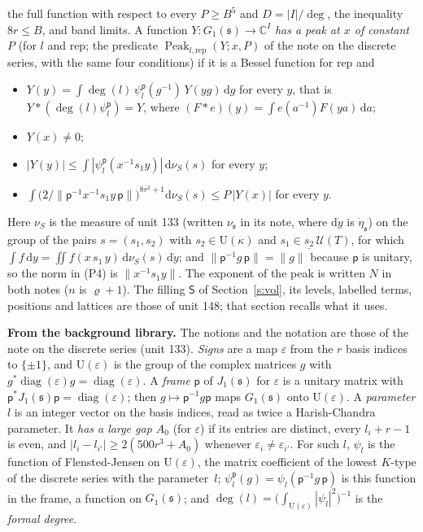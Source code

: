 \documentclass[11pt,a4paper]{article}
\newcommand{\subhead}[1]{\par\addvspace{9pt plus 2pt}\Needspace{4\baselineskip}\noindent\textbf{#1}\enspace\ignorespaces}
\theoremstyle{plainx}
\theoremstyle{uprightx}
\newcommand{\CC}{\mathbb{C}}
\newcommand{\dd}{\mathrm{d}}
\newcommand{\UT}[1]{\mathcal{U}(#1)}
\newcommand{\Gone}[1]{G_1(#1)}
\newcommand{\Jone}[1]{J_1(#1)}
\newcommand{\emb}[1]{\underline{#1}}
\begin{document}
the full function with respect to every $P\ge B^{5}$ and $D=|I|/\deg$, the inequality $8r\le B$, and band limits.
A function $Y\colon\Gone{\mathfrak{s}}\to\CC^I$ \emph{has a peak at $x$ of constant $P$} (for $l$ and
$\mathrm{rep}$; the predicate $\operatorname{Peak}_{l,\mathrm{rep}}(Y;x,P)$ of the note on the discrete series, with
the same four conditions) if it is a Bessel function for $\mathrm{rep}$ and
\begin{itemize}
\item[(P1)] $Y(y)=\int\deg(l)\,\psi^{\mathsf{p}}_l(g^{-1})\,Y(yg)\,\dd g$ for every $y$, that is
  $Y*(\deg(l)\psi^{\mathsf{p}}_l)=Y$, where $(F*e)(y)=\int e(a^{-1})F(ya)\,\dd a$;
\item[(P2)] $Y(x)\ne0$;
\item[(P3)] $|Y(y)|\le\int|\psi^{\mathsf{p}}_l(x^{-1}s_1y)|\,\dd\nu_S(s)$ for every $y$;
\item[(P4)] $\int\bigl(2/\|\mathsf{p}^{-1}x^{-1}s_1y\,\mathsf{p}\|\bigr)^{8r^{2}+1}\dd\nu_S(s)\le P\,|Y(x)|$ for every $y$.
\end{itemize}
Here $\nu_S$ is the measure of unit 133 (written $\nu_{\mathfrak{s}}$ in its note, where $\dd\dot y$ is
$\dot\eta_{\mathfrak{s}}$) on the group of the pairs $s=(s_1,s_2)$ with $s_2\in\mathrm{U}(\kappa)$ and
$s_1\in\emb{s_2}\,\UT{T}$, for which $\int f\,\dd y=\iint f(x\,s_1\,y)\,\dd\nu_S(s)\,\dd\dot y$; and
$\|\mathsf{p}^{-1}g\,\mathsf{p}\|=\|g\|$ because $\mathsf{p}$ is unitary, so the norm in (P4) is $\|x^{-1}s_1y\|$. The
exponent of the peak is written $N$ in both notes ($n$ is $\varrho+1$). The filling
$\mathsf{S}$ of Section~\ref{s:vol}, its levels, labelled terms, positions and lattices are those of unit 148;
that section recalls what it uses.

\subhead{From the background library.} The notions and the notation are those of the note on the discrete series
(unit 133). \emph{Signs} are a map $\varepsilon$ from the $r$ basis indices to $\{\pm1\}$, and
$\mathrm{U}(\varepsilon)$ is the group of the complex matrices $g$ with
$g^{*}\operatorname{diag}(\varepsilon)g=\operatorname{diag}(\varepsilon)$. A \emph{frame} $\mathsf{p}$ of
$\Jone{\mathfrak{s}}$ for $\varepsilon$ is a unitary matrix with
$\mathsf{p}^{*}\Jone{\mathfrak{s}}\mathsf{p}=\operatorname{diag}(\varepsilon)$; then $g\mapsto\mathsf{p}^{-1}g\mathsf{p}$
maps $\Gone{\mathfrak{s}}$ onto $\mathrm{U}(\varepsilon)$. A \emph{parameter} $l$ is an integer vector on the basis
indices, read as twice a Harish-Chandra parameter. It \emph{has a large gap $A_0$} (for $\varepsilon$) if its
entries are distinct, every $l_i+r-1$ is even, and $|l_i-l_{i'}|\ge2(500r^{3}+A_0)$ whenever
$\varepsilon_i\ne\varepsilon_{i'}$. For such $l$, $\psi_l$ is the function of Flensted-Jensen on
$\mathrm{U}(\varepsilon)$, the matrix coefficient of the lowest $K$-type of the discrete series with the
parameter~$l$; $\psi^{\mathsf{p}}_l(g)=\psi_l(\mathsf{p}^{-1}g\,\mathsf{p})$ is this function in the frame, a function on
$\Gone{\mathfrak{s}}$; and $\deg(l)=\bigl(\int_{\mathrm{U}(\varepsilon)}|\psi_l|^{2}\bigr)^{-1}$ is the \emph{formal
degree}.
\end{document}
